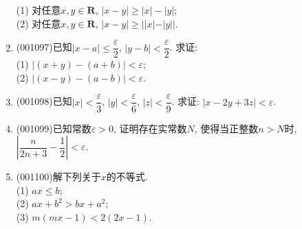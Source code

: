 \documentclass[10pt,a4paper]{article}
\begin{document}
\begin{enumerate}[1.]
(1) 对任意$x,y\in\mathbf{R}$, $|x-y|\ge |x|-|y|$;\\ 
(2) 对任意$x,y\in\mathbf{R}$, $|x-y|\ge ||x|-|y||$.
\item {\tiny (001097)}已知$|x-a|\le \dfrac{\varepsilon}{2}$, $|y-b|<\dfrac{\varepsilon}{2}$. 求证:\\ 
(1) $|(x+y)-(a+b)|<\varepsilon$;\\ 
(2) $|(x-y)-(a-b)|<\varepsilon$.
\item {\tiny (001098)}已知$|x|<\dfrac{\varepsilon}{3}$, $|y|<\dfrac{\varepsilon}{6}$, $|z|<\dfrac{\varepsilon}{9}$. 求证: $|x-2y+3z|<\varepsilon$.
\item {\tiny (001099)}已知常数$\varepsilon>0$, 证明存在实常数$N$, 使得当正整数$n>N$时, $\left|\dfrac{n}{2n+3}-\dfrac{1}{2}\right|<\varepsilon$.
\item {\tiny (001100)}解下列关于$x$的不等式.\\ 
(1) $ax\le b$;\\ 
(2) $ax+b^2>bx+a^2$;\\ 
(3) $m(mx-1)<2(2x-1)$.
\end{enumerate}
\end{document}
